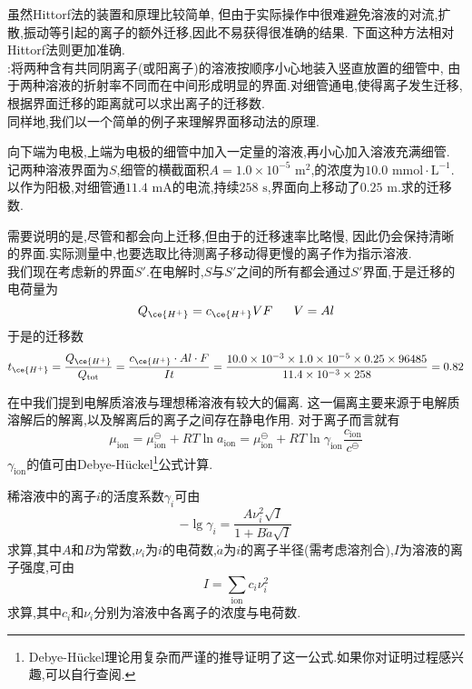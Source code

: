 \documentclass{ctexart}
\begin{document}
虽然Hittorf法的装置和原理比较简单,%
但由于实际操作中很难避免溶液的对流,扩散,振动等引起的离子的额外迁移,因此不易获得很准确的结果.%
下面这种方法相对Hittorf法则更加准确.\\
\indent{}:将两种含有共同阴离子(或阳离子)的溶液按顺序小心地装入竖直放置的细管中,%
由于两种溶液的折射率不同而在中间形成明显的界面.对细管通电,使得离子发生迁移,根据界面迁移的距离就可以求出离子的迁移数.\\
\indent 同样地,我们以一个简单的例子来理解界面移动法的原理.
\begin{exercise}[E.6A.2]
    向下端为电极,上端为电极的细管中加入一定量的溶液,再小心加入溶液充满细管.%
    记两种溶液界面为$S$,细管的横截面积$A=1.0\times10^{-5}\text{ m}^2$,的浓度为$10.0\text{ mmol}\cdot\text{L}^{-1}$.%
    以作为阳极,对细管通$11.4\text{ mA}$的电流,持续$258\text{ s}$,界面向上移动了$0.25\text{ m}$.求的迁移数.
\end{exercise}
\begin{solution}
    需要说明的是,尽管和都会向上迁移,但由于的迁移速率比略慢,%
    因此仍会保持清晰的界面.实际测量中,也要选取比待测离子移动得更慢的离子作为指示溶液.\\
    我们现在考虑新的界面$S'$.在电解时,$S$与$S'$之间的所有都会通过$S'$界面,于是迁移的电荷量为
    \[Q_{\ce{H^+}}=c_{\ce{H^+}}VF\ \ \ \ \ V=Al\]
    于是的迁移数
    \[t_{\ce{H^+}}=\dfrac{Q_{\ce{H^+}}}{Q_{\text{tot}}}
    =\dfrac{c_{\ce{H^+}}\cdot Al\cdot F}{It}
    =\dfrac{10.0\times10^{-3}\times1.0\times10^{-5}\times0.25\times96485}{11.4\times10^{-3}\times258}
    =0.82\]

\end{solution}
\vspace{8pt}
\indent 在中我们提到电解质溶液与理想稀溶液有较大的偏离.%
这一偏离主要来源于电解质溶解后的解离,以及解离后的离子之间存在静电作用.%
对于离子而言就有
\[\mu_{\text{ion}}=\mu_{\text{ion}}^\ominus+RT\ln a_{\text{ion}}=\mu_{\text{ion}}^\ominus+RT\ln \gamma_{\text{ion}}\dfrac{c_{\text{ion}}}{c^\ominus}\]
\indent $\gamma_{\text{ion}}$的值可由Debye-Hückel\footnote{Debye-Hückel理论用复杂而严谨的推导证明了这一公式.如果你对证明过程感兴趣,可以自行查阅.}公式计算.
\begin{theorem}
    稀溶液中的离子$i$的活度系数$\gamma_i$可由
    \[-\lg\gamma_i=\dfrac{A\nu_i^2\sqrt{I}}{1+B\mathring{a}\sqrt{I}}\]
    求算,其中$A$和$B$为常数,$\nu_i$为$i$的电荷数,$\mathring{a}$为$i$的离子半径(需考虑溶剂合),$I$为溶液的离子强度,可由
    \[I=\sum_{\text{ion}}c_i\nu_i^2\]
    求算,其中$c_i$和$\nu_i$分别为溶液中各离子的浓度与电荷数.
\end{theorem}
\end{document}
